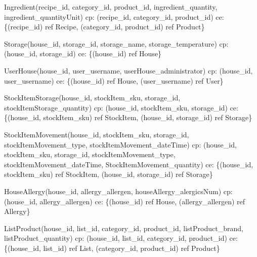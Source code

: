 {\begin{description}
		\item Ingredient(recipe\_id, category\_id, product\_id, ingredient\_quantity, ingredient\_quantityUnit) \newline
		\acrshort{cp}: (recipe\_id, category\_id, product\_id) \newline
		\acrshort{ce}: \{(recipe\_id) ref Recipe, (category\_id, product\_id) ref Product\}
		
		\item Storage(house\_id, storage\_id, storage\_name, storage\_temperature)  \newline
		\acrshort{cp}:(house\_id, storage\_id) \newline
		\acrshort{ce}: \{(house\_id) ref House\}
	
		\item UserHouse(house\_id, user\_username, userHouse\_administrator) \newline
		\acrshort{cp}: (house\_id, user\_username) \newline
		\acrshort{ce}: \{(house\_id) ref House, (user\_username) ref User\}
		
		\item StockItemStorage(house\_id, stockItem\_sku, storage\_id, stockItemStorage\_quantity) \newline
		\acrshort{cp}: (house\_id, stockItem\_sku, storage\_id) \newline
		\acrshort{ce}: \{(house\_id, stockItem\_sku) ref StockItem, (house\_id, storage\_id) ref Storage\}
		
		\item StockItemMovement(house\_id, stockItem\_sku, storage\_id, stockItemMovement\_type, \newline stockItemMovement\_dateTime) \newline
		\acrshort{cp}: (house\_id, stockItem\_sku, storage\_id, stockItemMovement\_type, \newline stockItemMovement\_dateTime, StockItemMovement\_quantity) \newline
		\acrshort{ce}: \{(house\_id, stockItem\_sku) ref StockItem, (house\_id, storage\_id) ref Storage\}
		
		\item HouseAllergy(house\_id, allergy\_allergen, houseAllergy\_alergicsNum) \newline
		\acrshort{cp}: (house\_id, allergy\_allergen) \newline
		\acrshort{ce}: \{(house\_id) ref House, (allergy\_allergen) ref Allergy\}
	
		\item ListProduct(house\_id, list\_id, category\_id, product\_id, listProduct\_brand, listProduct\_quantity) \newline
		\acrshort{cp}: (house\_id, list\_id, category\_id, product\_id) \newline
		\acrshort{ce}: \{(house\_id, list\_id) ref List, (category\_id, product\_id) ref Product\}
	

\end{description}}
